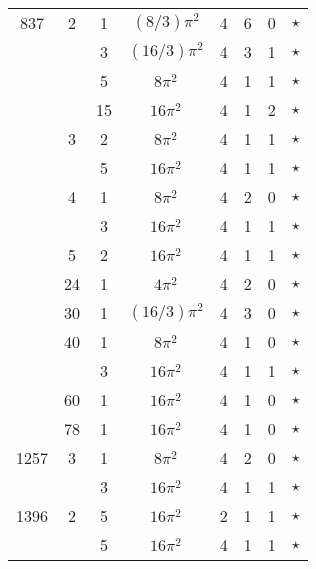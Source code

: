 \documentclass[12pt]{amsart}
\begin{document}
\begin{tabular}{ccc|ccccc}
837 & 2 & 1 & $(8/3)\pi^2$ & 4 & 6 & 0 & $\star$ \\
 &  & 3 & $(16/3)\pi^2$ & 4 & 3 & 1 & $\star$ \\
 &  & 5 & $8\pi^2$ & 4 & 1 & 1 & $\star$ \\
 &  & 15 & $16\pi^2$ & 4 & 1 & 2 & $\star$ \\
 & 3 & 2 & $8\pi^2$ & 4 & 1 & 1 & $\star$ \\
 &  & 5 & $16\pi^2$ & 4 & 1 & 1 & $\star$ \\
 & 4 & 1 & $8\pi^2$ & 4 & 2 & 0 & $\star$ \\
 &  & 3 & $16\pi^2$ & 4 & 1 & 1 & $\star$ \\
 & 5 & 2 & $16\pi^2$ & 4 & 1 & 1 & $\star$ \\
 & 24 & 1 & $4\pi^2$ & 4 & 2 & 0 & $\star$ \\
 & 30 & 1 & $(16/3)\pi^2$ & 4 & 3 & 0 & $\star$ \\
 & 40 & 1 & $8\pi^2$ & 4 & 1 & 0 & $\star$ \\
 &  & 3 & $16\pi^2$ & 4 & 1 & 1 & $\star$ \\
 & 60 & 1 & $16\pi^2$ & 4 & 1 & 0 & $\star$ \\
 & 78 & 1 & $16\pi^2$ & 4 & 1 & 0 & $\star$ \\
1257 & 3 & 1 & $8\pi^2$ & 4 & 2 & 0 & $\star$ \\
 &  & 3 & $16\pi^2$ & 4 & 1 & 1 & $\star$ \\
1396 & 2 & 5 & $16\pi^2$ & 2 & 1 & 1 & $\star$ \\
 &  & 5 & $16\pi^2$ & 4 & 1 & 1 & $\star$ \\
\end{tabular}
\end{document}
